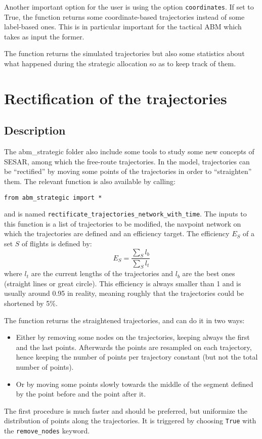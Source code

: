 \documentclass[12pt]{article}
\begin{document}
Another important option for the user is using the option \verb|coordinates|. If set to True, the function returns some coordinate-based trajectories instead of some label-based ones. This is in particular important for the tactical ABM which takes as input the former.

The function returns the simulated trajectories but also some statistics about what happened during the strategic allocation so as to keep track of them.

\section{Rectification of the trajectories}
\label{sec:rectification}

\subsection{Description}

The abm\_strategic folder also include some tools to study some new concepts of SESAR, among which the free-route trajectories. In the model, trajectories can be ``rectified'' by moving some points of the trajectories in order to ``straighten'' them. The relevant function is also available by calling:
\begin{verbatim}
from abm_strategic import *
\end{verbatim}
and is named \verb|rectificate_trajectories_network_with_time|. The inputs to this function is a list of trajectories to be modified, the navpoint network on which the trajectories are defined and an efficiency target. The efficiency $E_S$ of a set $S$ of flights is defined by:
$$
E_S = \frac{\sum_S l_b}{\sum_S l_t}
$$
where $l_t$ are the current lengths of the trajectories and $l_b$ are the best ones (straight lines or great circle). This efficiency is always smaller than 1 and is usually around 0.95 in reality, meaning roughly that the trajectories could be shortened by 5\%.

The function returns the straightened trajectories, and can do it in two ways:
\begin{itemize}
\item Either by removing some nodes on the trajectories, keeping always the first and the last points. Afterwards the points are resampled on each trajectory, hence keeping the number of points per trajectory constant (but not the total number of points).
\item Or by moving some points slowly towards the middle of the segment defined by the point before and the point after it.
\end{itemize}
The first procedure is much faster and should be preferred, but uniformize the distribution of points along the trajectories. It is triggered by choosing \verb|True| with the \verb|remove_nodes| keyword.
\end{document}
